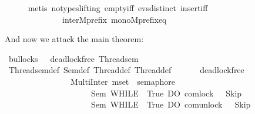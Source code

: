 \begin{isabellebody}
\ \ \ \ \isamarkupfalse%
\ {\isacharparenleft}{\kern0pt}metis\ {\isacharparenleft}{\kern0pt}no{\isacharunderscore}{\kern0pt}types{\isacharcomma}{\kern0pt}lifting{\isacharparenright}{\kern0pt}\ empty{\isacharunderscore}{\kern0pt}iff\ evs{\isachardot}{\kern0pt}distinct{\isacharparenleft}{\kern0pt}{}{\isacharparenright}{\kern0pt}\ insert{\isacharunderscore}{\kern0pt}iff\ \isanewline
\ \ \ \ \ \ \ \ \ \ \ \ \ \ inter{}Mprefix{}\ mono{\isacharunderscore}{\kern0pt}Mprefix{\isacharunderscore}{\kern0pt}eq{\isacharparenright}{\kern0pt}\isanewline
\ \ \isamarkupfalse%
%
\endisatagproof
{\isafoldproof}%
%
\isadelimproof
%
\endisadelimproof
%
\begin{isamarkuptext}%
And now we attack the main theorem:%
\end{isamarkuptext}\isamarkuptrue%
\isamarkupfalse%
\ bullocks{}\ {\isacharcolon}{\kern0pt}\ \ {\isacartoucheopen}deadlock{\isacharunderscore}{\kern0pt}free\ Thread{}{\isacharunderscore}{\kern0pt}sem{\isacartoucheclose}\ \ \isanewline
%
\isadelimproof
\ \ %
\endisadelimproof
%
\isatagproof
{}\isamarkupfalse%
\ Thread{}{\isacharunderscore}{\kern0pt}sem{\isacharunderscore}{\kern0pt}def\ Sem{\isacharunderscore}{\kern0pt}def\ Thread{}{\isacharunderscore}{\kern0pt}def\ Thread{}{\isacharunderscore}{\kern0pt}def\isanewline
{}\isamarkupfalse%
\ {\isacharminus}{\kern0pt}\ \isanewline
\ \ \isamarkupfalse%
\ {\isacartoucheopen}deadlock{\isacharunderscore}{\kern0pt}free\isanewline
\ \ \ \ \ \ \ \ \ \ \ \ \ \ \ {\isacharparenleft}{\kern0pt}\ MultiInter\ {\isacharparenleft}{\kern0pt}mset\ {\isacharbrackleft}{\kern0pt}{}{\isachardot}{\kern0pt}{\isachardot}{\kern0pt}{}{\isacharbrackright}{\kern0pt}{\isacharparenright}{\kern0pt}\ semaphore\isanewline
\ \ \ \ \ \ \ \ \ \ \ \ \ \ \ \ {\isacharbar}{\kern0pt}{\isacharbar}{\kern0pt}\ {\isacharparenleft}{\kern0pt}\ \ \ \ Sem\ {\isacharparenleft}{\kern0pt}WHILE\ {\isasymlambda}{\isasymsigma}{\isachardot}{\kern0pt}\ True\ DO\ com{\isachardot}{\kern0pt}lock\ {}{\isacharparenright}{\kern0pt}\ {\isacharparenleft}{\kern0pt}{\isasymlambda}{\isacharunderscore}{\kern0pt}{\isachardot}{\kern0pt}\ Skip{\isacharparenright}{\kern0pt}\ {\isasymsigma}\ \isanewline
\ \ \ \ \ \ \ \ \ \ \ \ \ \ \ \ \ \ \ \ {\isacharbar}{\kern0pt}{\isacharbar}{\kern0pt}{\isacharbar}{\kern0pt}\ Sem\ {\isacharparenleft}{\kern0pt}WHILE\ {\isasymlambda}{\isasymsigma}{\isachardot}{\kern0pt}\ True\ DO\ com{\isachardot}{\kern0pt}unlock\ {}{\isacharparenright}{\kern0pt}\ {\isacharparenleft}{\kern0pt}{\isasymlambda}{\isacharunderscore}{\kern0pt}{\isachardot}{\kern0pt}\ Skip{\isacharparenright}{\kern0pt}\ {\isasymsigma}\isanewline

\end{isabellebody}
